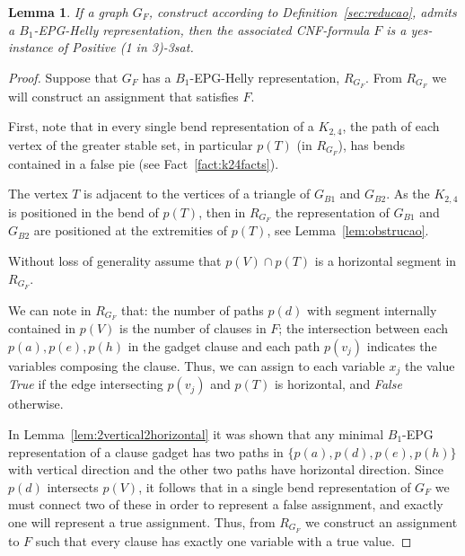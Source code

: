 \documentclass[preprint,12pt]{elsarticle} %
\newtheorem{lema}[theorem]{Lemma}
\begin{document}
\begin{lema}\label{lem:volta}
If a graph $G_F$, construct according to Definition~\ref{sec:reducao}, admits a $B_1$-EPG-Helly representation, then the associated CNF-formula $F$ is a yes-instance of {\sc Positive (1 in 3)-3sat}.
\end{lema}

\begin{proof}
Suppose that $G_F$ has a $B_1$-EPG-Helly representation, $R_{G_F}$.  From $R_{G_F}$ we will construct an assignment that satisfies $F$. 

First, note that in every single bend representation of a $K_{2,4}$, the path of each vertex of the greater stable set, in particular $p(T)$ (in $R_{G_F}$), has bends contained in a false pie (see Fact~\ref{fact:k24facts}). %

The vertex $T$ is adjacent to the vertices of a triangle of $G_{B1}$ and $G_{B2}$. As the $K_{2,4}$ is positioned in the bend of $p(T)$, then in $R_{G_F}$ the representation of $G_{B1}$ and $G_{B2}$ are positioned at the extremities of $p(T)$, see Lemma~\ref{lem:obstrucao}.   

Without loss of generality assume that $p(V) \cap p(T)$ is a horizontal segment in $R_{G_F}$.

We can note in $R_{G_F}$ that: the number of paths $p(d)$ with segment internally contained in $p(V)$ is the number of clauses in $F$; the intersection between each $p(a), p(e), p(h)$ in the gadget clause and each path $p(v_j)$ indicates the variables composing the clause. Thus, we can assign to each variable $ x_{j}$ the value \textit{True} if the edge intersecting $p(v_j)$ and $p(T)$ is horizontal, and \textit{False} otherwise. 




In Lemma~\ref{lem:2vertical2horizontal} it was shown that any minimal $B_1$-EPG representation of a clause gadget has two paths in $\{p(a), p(d), p(e), p(h)\}$ with vertical direction and the other two paths have horizontal direction. Since $p(d)$ intersects $p(V)$, it follows that in a single bend representation of $G_F$ we must connect two of these in order to represent a false assignment, and exactly one will represent a true assignment. Thus, from $R_{G_F}$ we construct an assignment to $F$ such that every clause has exactly one variable with a true value.  


\end{proof}
\end{document}
